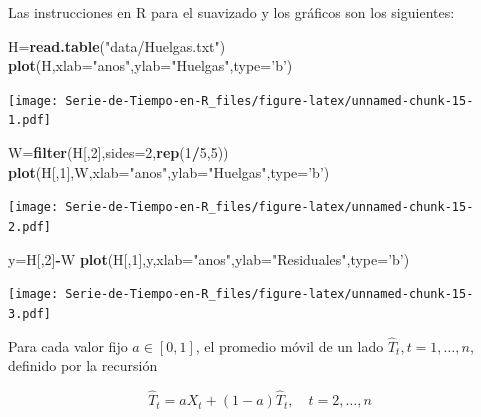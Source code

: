 \documentclass[12pt,]{krantz}
\makeatletter
\newenvironment{Shaded}{\begin{snugshade}}{\end{snugshade}}
\newcommand{\KeywordTok}[1]{\textcolor[rgb]{0.13,0.29,0.53}{\textbf{#1}}}
\newcommand{\DataTypeTok}[1]{\textcolor[rgb]{0.13,0.29,0.53}{#1}}
\newcommand{\DecValTok}[1]{\textcolor[rgb]{0.00,0.00,0.81}{#1}}
\newcommand{\StringTok}[1]{\textcolor[rgb]{0.31,0.60,0.02}{#1}}
\newcommand{\OperatorTok}[1]{\textcolor[rgb]{0.81,0.36,0.00}{\textbf{#1}}}
\newcommand{\NormalTok}[1]{#1}
\newenvironment{kframe}{%
\medskip{}
\setlength{\fboxsep}{.8em}
 \def\at@end@of@kframe{}%
 \ifinner\ifhmode%
  \def\at@end@of@kframe{\end{minipage}}%
  \begin{minipage}{\columnwidth}%
 \fi\fi%
 \def\FrameCommand##1{\hskip\@totalleftmargin \hskip-\fboxsep
 \colorbox{shadecolor}{##1}\hskip-\fboxsep
     \hskip-\linewidth \hskip-\@totalleftmargin \hskip\columnwidth}%
 \MakeFramed {\advance\hsize-\width
   \@totalleftmargin\z@ \linewidth\hsize
   \@setminipage}}%
 {\par\unskip\endMakeFramed%
 \at@end@of@kframe}
\renewenvironment{Shaded}{\begin{kframe}}{\end{kframe}}
\theoremstyle{definition}
\theoremstyle{definition}
\theoremstyle{definition}
\theoremstyle{remark}
\makeatother
\begin{document}
Las instrucciones en R para el suavizado y los gráficos son los
siguientes:

\begin{Shaded}
\begin{Highlighting}[]
\NormalTok{H=}\KeywordTok{read.table}\NormalTok{(}\StringTok{"data/Huelgas.txt"}\NormalTok{)}
\KeywordTok{plot}\NormalTok{(H,}\DataTypeTok{xlab=}\StringTok{"anos"}\NormalTok{,}\DataTypeTok{ylab=}\StringTok{"Huelgas"}\NormalTok{,}\DataTypeTok{type=}\StringTok{'b'}\NormalTok{)}
\end{Highlighting}
\end{Shaded}

\texttt{[image: Serie-de-Tiempo-en-R\_files/figure-latex/unnamed-chunk-15-1.pdf]}

\begin{Shaded}
\begin{Highlighting}[]
\NormalTok{W=}\KeywordTok{filter}\NormalTok{(H[,}\DecValTok{2}\NormalTok{],}\DataTypeTok{sides=}\DecValTok{2}\NormalTok{,}\KeywordTok{rep}\NormalTok{(}\DecValTok{1}\OperatorTok{/}\DecValTok{5}\NormalTok{,}\DecValTok{5}\NormalTok{))}
\KeywordTok{plot}\NormalTok{(H[,}\DecValTok{1}\NormalTok{],W,}\DataTypeTok{xlab=}\StringTok{"anos"}\NormalTok{,}\DataTypeTok{ylab=}\StringTok{"Huelgas"}\NormalTok{,}\DataTypeTok{type=}\StringTok{'b'}\NormalTok{)}
\end{Highlighting}
\end{Shaded}

\texttt{[image: Serie-de-Tiempo-en-R\_files/figure-latex/unnamed-chunk-15-2.pdf]}

\begin{Shaded}
\begin{Highlighting}[]
\NormalTok{y=H[,}\DecValTok{2}\NormalTok{]}\OperatorTok{-}\NormalTok{W}
\KeywordTok{plot}\NormalTok{(H[,}\DecValTok{1}\NormalTok{],y,}\DataTypeTok{xlab=}\StringTok{"anos"}\NormalTok{,}\DataTypeTok{ylab=}\StringTok{"Residuales"}\NormalTok{,}\DataTypeTok{type=}\StringTok{'b'}\NormalTok{)}
\end{Highlighting}
\end{Shaded}

\texttt{[image: Serie-de-Tiempo-en-R\_files/figure-latex/unnamed-chunk-15-3.pdf]}

Para cada valor fijo \(a\in[0,1]\), el promedio móvil de un lado
\(\hat{T}_t, t=1,\ldots,n\), definido por la recursión

\begin{equation}
  \hat{T}_t = aX_t+(1-a)\hat{T}_t,\quad t=2,\ldots,n
 \label{eq:eq-promedio-movil-1-lado-peso}
\end{equation}
\end{document}
